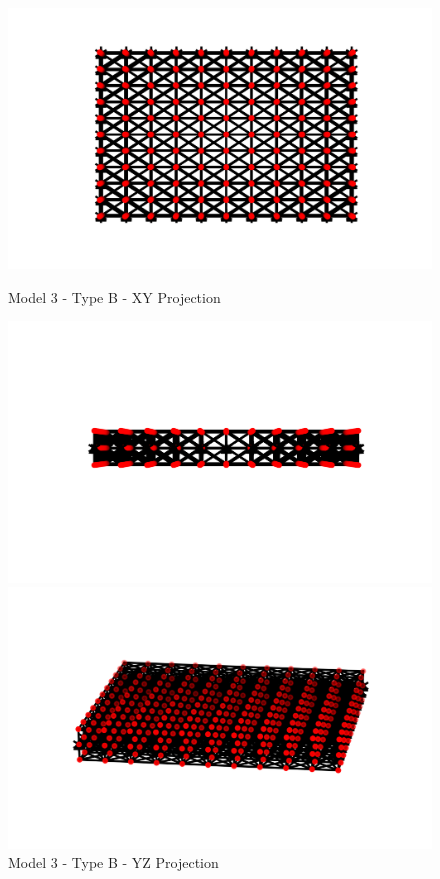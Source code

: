 \begin{figure}[!htbp]
\begin{minipage}{0.3\textwidth}
    \centering
    \includegraphics[width = 1\textwidth]{Figures/M3_b_XY.png}
    \caption{Model 3 - Type B - XY Projection}
    \label{fig:M3_b_XY}
\end{minipage}
\hspace{5mm}
\begin{minipage}{0.3\textwidth}
    \centering
    \includegraphics[width = 1\textwidth]{Figures/M3_b_YZ.png}
    \caption{Model 3 - Type B - YZ Projection}
    \label{fig:M3_b_YZ}
\end{minipage}
\hspace{5mm}
\begin{minipage}{0.3\textwidth}
    \centering
    \includegraphics[width = 1\textwidth]{Figures/M3_b_3D.png}

\end{minipage}
\end{figure}
